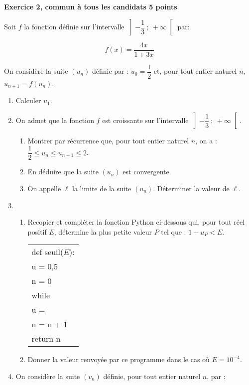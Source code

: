 \documentclass[11pt]{article}
\begin{document}
\bigskip

\textbf{Exercice 2, commun à tous les candidats \hfill 5 points}

\medskip

Soit $f$ la fonction définie sur l'intervalle $\left]-\dfrac{1}{3}~;~+\infty\right[$ par:

\[ f(x) = \dfrac{4x}{1 + 3x}\]

On considère la suite $\left(u_n\right)$ définie par : $u_0 = \dfrac{1}{2}$ et, pour tout entier naturel $n$,\, $u_{n+1} = f\left(u_n\right)$.

\medskip

\begin{enumerate}
\item Calculer $u_1$.
\item On admet que la fonction $f$ est croissante sur l'intervalle $\left]-\dfrac{1}{3}~;~+\infty\right[$.
	\begin{enumerate}
		\item Montrer par récurrence que, pour tout entier naturel $n$, on a : $\dfrac{1}{2} \leqslant u_n \leqslant u_{n+1} \leqslant 2$.
		\item En déduire que la suite $\left(u_n\right)$ est convergente.
		\item On appelle $\ell$ la limite de la suite $\left(u_n\right)$. Déterminer la valeur de $\ell$.
	\end{enumerate}
\item 
	\begin{enumerate}
		\item Recopier et compléter la fonction Python ci-dessous qui, pour tout réel positif $E$, détermine la plus petite valeur $P$ tel que : $1 - u_{P} < E$.
		
\begin{center}
\begin{tabularx}{0.4\linewidth}{|X|}\hline
def seuil($E$):\\
\quad u = 0,5\\
\quad n = 0 \\
\quad  while \dotfill\\
\quad \quad u = \dotfill\\
\quad \quad n = n + 1\\
\quad return n\\ \hline
\end{tabularx}
\end{center}
		\item Donner la valeur renvoyée par ce programme dans le cas où $E= 10^{-4}$.
	\end{enumerate}
\item On considère la suite $\left(v_n\right)$ définie, pour tout entier naturel $n$, par :


\end{enumerate}
\end{document}
